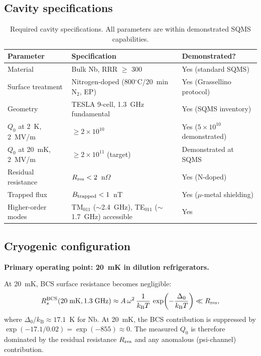 \documentclass[11pt]{article}
\newcommand{\ee}[1]{\times 10^{#1}}
\newcommand{\kB}{k_{\mathrm{B}}}
\begin{document}
\subsection{Cavity specifications}

\begin{table}[H]
\centering
\caption{Required cavity specifications. All parameters are within
demonstrated SQMS capabilities.}
\label{tab:cavity_specs}
\renewcommand{\arraystretch}{1.25}
\begin{tabular}{@{}lll@{}}
\toprule
\textbf{Parameter} & \textbf{Specification} & \textbf{Demonstrated?} \\
\midrule
Material & Bulk Nb, RRR $\geq$ 300 & Yes (standard SQMS) \\
Surface treatment & Nitrogen-doped (800$^\circ$C/20~min N$_2$, EP) &
  Yes (Grassellino protocol) \\
Geometry & TESLA 9-cell, 1.3~GHz fundamental & Yes (SQMS inventory) \\
$Q_0$ at 2~K, 2~MV/m & $\geq 2\ee{10}$ & Yes ($5\ee{10}$ demonstrated) \\
$Q_0$ at 20~mK, 2~MV/m & $\geq 2\ee{11}$ (target) & Demonstrated at SQMS \\
Residual resistance & $R_{\rm res} < 2$~n$\Omega$ & Yes (N-doped) \\
Trapped flux & $B_{\rm trapped} < 1$~nT & Yes ($\mu$-metal shielding) \\
Higher-order modes & TM$_{011}$ ($\sim$2.4~GHz), TE$_{011}$
  ($\sim$1.7~GHz) accessible & Yes \\
\bottomrule
\end{tabular}
\end{table}

\subsection{Cryogenic configuration}

\textbf{Primary operating point: 20~mK in dilution refrigerators.}

At 20~mK, BCS surface resistance becomes negligible:
\begin{equation}
R_s^{\rm BCS}(20\;\text{mK}, 1.3\;\text{GHz}) \approx
A\,\omega^2\,\frac{1}{\kB T}\,
\exp\!\left(-\frac{\Delta_0}{\kB T}\right)
\ll R_{\rm res},
\end{equation}
where $\Delta_0/\kB \approx 17.1$~K for Nb. At 20~mK, the
BCS contribution is suppressed by $\exp(-17.1/0.02) = \exp(-855) \approx 0$.
The measured $Q_0$ is therefore dominated by the residual resistance
$R_{\rm res}$ and any anomalous (psi-channel) contribution.
\end{document}
